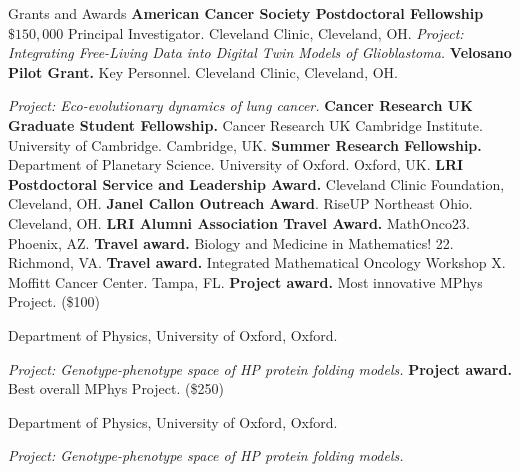 \begin{rubric}{Grants and Awards}
\entry*[2025-2027]  \textbf{American Cancer Society Postdoctoral Fellowship} $\$150,000$ Principal Investigator. Cleveland Clinic, Cleveland, OH. \textit{Project: Integrating Free-Living Data into Digital Twin Models of Glioblastoma.}
\entry*[2021-23] \textbf{Velosano Pilot Grant.}  Key Personnel. Cleveland Clinic, Cleveland, OH. \par \textit{Project: Eco-evolutionary dynamics of lung cancer.}
\entry*[2016-2020] \textbf{Cancer Research UK Graduate Student Fellowship.} Cancer Research UK Cambridge Institute. University of Cambridge. Cambridge, UK.
\entry*[2014-15] \textbf{Summer Research Fellowship.} Department of Planetary Science. University of Oxford. Oxford, UK.
%
\entry*[2024]  \textbf{LRI Postdoctoral Service and Leadership Award.} Cleveland Clinic Foundation, Cleveland, OH. 
\entry*[2024] \textbf{Janel Callon Outreach Award}. RiseUP Northeast Ohio. Cleveland, OH. 
\entry*[2023] \textbf{LRI Alumni Association Travel 
Award.} MathOnco23. Phoenix, AZ. 
\entry*[2022] \textbf{Travel award.} Biology and Medicine in Mathematics! 22. Richmond, VA. 
\entry*[2022] \textbf{Travel award.} Integrated Mathematical Oncology Workshop X. Moffitt Cancer Center. Tampa, FL. 
\entry*[2015] \textbf{Project award.} Most innovative MPhys Project. (\$100)
\par Department of Physics, University of Oxford, Oxford. 
\par \textit{Project: Genotype-phenotype space of HP protein folding models.}
\entry*[2015] \textbf{Project award.} Best overall MPhys Project. (\$250)
\par Department of Physics, University of Oxford, Oxford. 
\par \textit{Project: Genotype-phenotype space of HP protein folding models.}
\end{rubric}